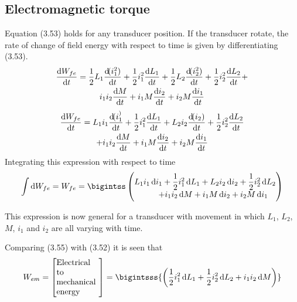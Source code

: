 \documentclass[a4paper,numbers=noenddot,12pt]{scrbook}
\begin{document}
\subsection{Electromagnetic torque}
Equation (3.53) holds for any transducer position. If the transducer rotate, the rate of change of field energy with respect to time is given by differentiating (3.53).
\begin{multline*}
    \dfrac{\dif W_{fe}}{\dif t} = 
    \dfrac{1}{2} L_1 \dfrac{\dif (i_1^2)}{\dif t} + 
    \dfrac{1}{2} i_1^2 \dfrac{\dif L_1}{\dif t} +
    \dfrac{1}{2} L_2 \dfrac{\dif (i_2^2)}{\dif t} +
    \dfrac{1}{2} i_2^2 \dfrac{\dif L_2}{\dif t} + \\
    i_1 i_2 \dfrac{\dif M}{\dif t} +
    i_1 M \dfrac{\dif i_2}{\dif t} +
    i_2 M \dfrac{\dif i_1}{\dif t} 
\end{multline*}
\begin{multline}
    \dfrac{\dif W_{fe}}{\dif t} = 
    L_1 i_1 \dfrac{\dif (i_1^)}{\dif t} + 
    \dfrac{1}{2} i_1^2 \dfrac{\dif L_1}{\dif t} +
    L_2 i_2 \dfrac{\dif (i_2)}{\dif t} +
    \dfrac{1}{2} i_2^2 \dfrac{\dif L_2}{\dif t} \\
    + i_1 i_2 \dfrac{\dif M}{\dif t} +
    i_1 M \dfrac{\dif i_2}{\dif t} +
    i_2 M \dfrac{\dif i_1}{\dif t}
    \label{eq:Eq3.54}
\end{multline}
Integrating this expression with respect to time
\begin{equation}
    \int \dif W_{fe} = W_{fe} = \bigintss
    \begin{pmatrix}
        L_1 i_1 \dif i_1 + \dfrac{1}{2} i_1^2 \dif L_1 + L_2 i_2 \dif i_2 + \dfrac{1}{2} i_2^2 \dif L_2 \\
        \qquad + i_1 i_2 \dif M + i_1 M \dif i_2 + i_2 M \dif i_1
    \end{pmatrix}
    \label{eq:Eq3.55}
\end{equation}

This expression is now general for a transducer with movement in which $L_1$, $L_2$, $M$, $i_1$ and $i_2$ are all varying with time.

Comparing (3.55) with (3.52) it is seen that
\begin{equation}
    W_{em} = \left[\parbox{12ex}{Electrical to\\mechanical\\energy} \right] = \bigintsss{\left( \dfrac{1}{2} i_1^2 \dif L_1 + \dfrac{1}{2} i_2^2 \dif L_2 + i_1 i_2 \dif M \right)}
    \label{eq:Eq3.56}
\end{equation}
\end{document}
